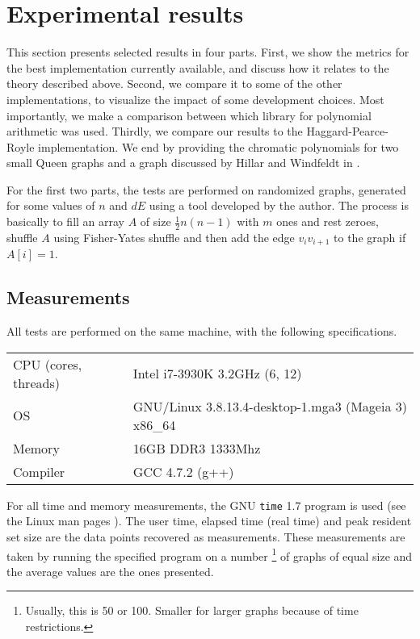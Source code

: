 \documentclass[a4paper]{article}
\newcommand{\code}{\texttt}
\begin{document}
\section{Experimental results}
This section presents selected results in four parts. First, we show the metrics for the best implementation currently available, and discuss how it relates to the theory described above. Second, we compare it to some of the other implementations, to visualize the impact of some development choices. Most importantly, we make a comparison between which library for polynomial arithmetic was used. Thirdly, we compare our results to the Haggard-Pearce-Royle implementation.
We end by providing the chromatic polynomials for two small Queen graphs and a graph discussed by Hillar and Windfeldt in \cite{hillar_windfeldt}. 

For the first two parts, the tests are performed on randomized graphs, generated for some values of $n$ and $dE$ using a tool developed by the author. The process is basically to fill an array $A$ of size $\frac{1}{2}n(n-1)$ with $m$ ones and rest zeroes, shuffle $A$ using Fisher-Yates shuffle and then add the edge $v_iv_{i+1}$ to the graph if $A[i] = 1$.

\subsection{Measurements}
All tests are performed on the same machine, with the following specifications.

\begin{center}
\begin{tabular}{l|l}
CPU (cores, threads) & Intel i7-3930K 3.2GHz (6, 12) \\ 
OS & GNU/Linux 3.8.13.4-desktop-1.mga3 (Mageia 3) x86\_64 \\ 
Memory & 16GB DDR3 1333Mhz \\ 
Compiler & GCC 4.7.2 (g++) \\ 
\end{tabular}
\end{center}

For all time and memory measurements, the GNU \code{time} 1.7 program is used (see the Linux man pages \cite{time}). The user time, elapsed time (real time) and peak resident set size are the data points recovered as measurements. These measurements are taken by running the specified program on a number
\footnote{Usually, this is 50 or 100. Smaller for larger graphs because of time restrictions.} 
of graphs of equal size and the average values are the ones presented.
\end{document}
